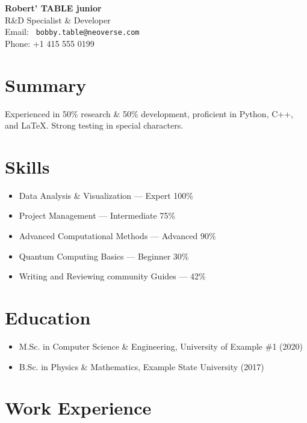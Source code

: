 \documentclass[a4paper,11pt]{article}
\begin{document}
\begin{center}
  {\LARGE \textbf{ Robert' TABLE junior }}\\[0.5em]
  R\&D Specialist \& Developer \\
  \vspace{1em}
  Email: \texttt{ bobby.table@neoverse.com } \\
  Phone: +1 415 555 0199
\end{center}

\section*{Summary}
Experienced in 50\% research \& 50\% development, proficient in Python, C++, and LaTeX. Strong testing in special characters.


\section*{Skills}
\begin{itemize}

  \item Data Analysis \& Visualization — Expert 100\%

  \item Project Management — Intermediate 75\%

  \item Advanced Computational Methods — Advanced 90\%

  \item Quantum Computing Basics — Beginner 30\%

  \item Writing and Reviewing community Guides — 42\%

\end{itemize}

\section*{Education}
\begin{itemize}

  \item M.Sc. in Computer Science \& Engineering, University of Example \#1 (2020)

  \item B.Sc. in Physics \& Mathematics, Example State University (2017)

\end{itemize}

\section*{Work Experience}
\end{document}
